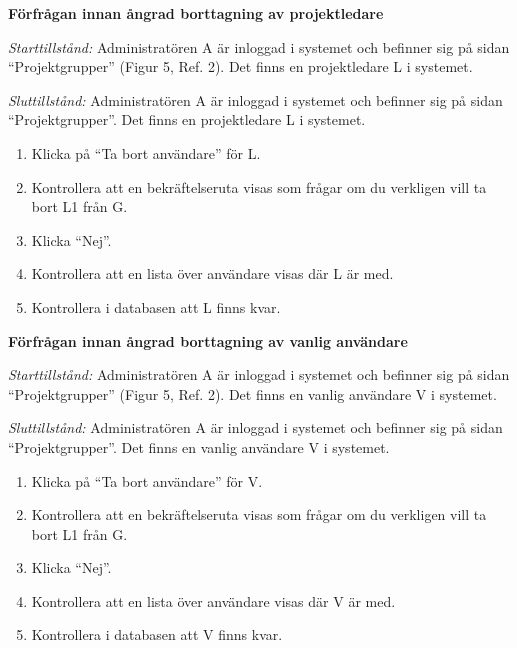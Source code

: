 \documentclass[a4paper]{article}
\begin{document}
\begin{FT}
\item \textbf{Förfrågan innan ångrad borttagning av projektledare}

\emph{Starttillstånd:} Administratören A är inloggad i systemet och befinner sig på sidan ``Projektgrupper'' (Figur 5, Ref. 2). Det finns en projektledare L i systemet.

\emph{Sluttillstånd:} Administratören A är inloggad i systemet och befinner sig på sidan ``Projektgrupper''. Det finns en projektledare L i systemet.

\begin{enumerate}
\item Klicka på ``Ta bort användare'' för L.
\item Kontrollera att en bekräftelseruta visas som frågar om du verkligen vill ta bort L1 från G.
\item Klicka ``Nej''.
\item Kontrollera att en lista över användare visas där L är med.
\item Kontrollera i databasen att L finns kvar.
\end{enumerate}

\item \textbf{Förfrågan innan ångrad borttagning av vanlig användare}

\emph{Starttillstånd:} Administratören A är inloggad i systemet och befinner sig på sidan ``Projektgrupper'' (Figur 5, Ref. 2). Det finns en vanlig användare V i systemet.

\emph{Sluttillstånd:} Administratören A är inloggad i systemet och befinner sig på sidan ``Projektgrupper''. Det finns en vanlig användare V i systemet.

\begin{enumerate}
\item Klicka på ``Ta bort användare'' för V.
\item Kontrollera att en bekräftelseruta visas som frågar om du verkligen vill ta bort L1 från G.
\item Klicka ``Nej''.
\item Kontrollera att en lista över användare visas där V är med.
\item Kontrollera i databasen att V finns kvar.
\end{enumerate}
\end{FT}

\end{document}
